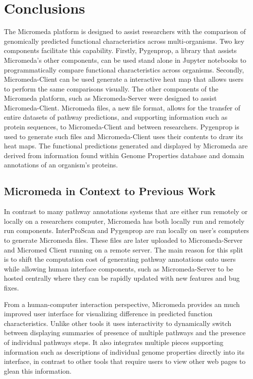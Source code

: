 \chapter{Conclusions} \label{conclusion-chapter}

The Micromeda platform is designed to assist researchers with the comparison of genomically predicted functional characteristics across multi-organisms. Two key components facilitate this capability. Firstly, Pygenprop, a library that assists Micromeda's other components, can be used stand alone in Jupyter notebooks to programmatically compare functional characteristics across organisms. Secondly, Micromeda-Client can be used generate a interactive heat map that allows users to perform the same comparisons visually. The other components of the Micromeda platform, such as Micromeda-Server were designed to assist Micromeda-Client. Micromeda files, a new file format, allows for the transfer of entire datasets of pathway predictions, and supporting information such as protein sequences, to Micromeda-Client and between researchers. Pygenprop is used to generate such files and Micromeda-Client uses their contents to draw its heat maps. The functional predictions generated and displayed by Micromeda are derived from information found within Genome Properties database and domain annotations of an organism's proteins. 

\section{Micromeda in Context to Previous Work}

In contrast to many pathway annotations systems that are either run remotely or locally on a researchers computer, Micromeda has both locally run and remotely run components. InterProScan and Pygenprop are ran locally on user's computers to generate Micromeda files. These files are later uploaded to Micromeda-Server and Micromed Client running on a remote server. The main reason for this split is to shift the computation cost of generating pathway annotations onto users while allowing human interface components, such as Micromeda-Server to be hosted centrally where they can be rapidly updated with new features and bug fixes.

From a human-computer interaction perspective, Micromeda provides an much improved user interface for visualizing difference in predicted function characteristics. Unlike other tools it uses interactivity to dynamically switch between displaying summaries of presence of multiple pathways and the presence of individual pathways steps. It also integrates multiple pieces supporting information such as descriptions of individual genome properties directly into its interface, in contrast to other tools that require users to view other web pages to glean this information.

